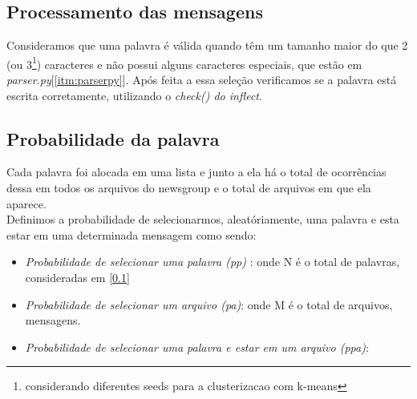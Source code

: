 \documentclass[a4paper,10pt]{article}
\begin{document}
\subsection{Processamento das mensagens}\label{itm:dicproctext} Consideramos que uma palavra é válida quando têm um tamanho maior do que 2 (ou 3\footnote{considerando diferentes seeds para a clusterizacao com k-means}) caracteres e não possui alguns caracteres especiais, que estão em \emph{parser.py}[\ref{itm:parserpy}]. Após feita a essa seleção verificamos se a palavra está escrita corretamente, utilizando o \emph{check() do inflect}.
\subsection{Probabilidade da palavra}\label{itm:dicprob} Cada palavra foi alocada em uma lista e junto a ela há o total de ocorrências dessa em todos os arquivos do newsgroup e o total de arquivos em que ela aparece.\\ Definimos a probabilidade de selecionarmos, aleatóriamente, uma palavra e esta estar em uma determinada mensagem como sendo:\\
\begin{itemize}
  \item \emph{Probabilidade de selecionar uma palavra (pp)} \label{itm:psp}: onde N é o total de palavras, consideradas em [\ref{itm:dicproctext}]
    \item \emph{Probabilidade de selecionar um arquivo (pa)}\label{itm:psa}: onde M é o total de arquivos, mensagens.
      \item \emph{Probabilidade de selecionar uma palavra e estar em um arquivo (ppa)}: 
\end{itemize}
\end{document}
